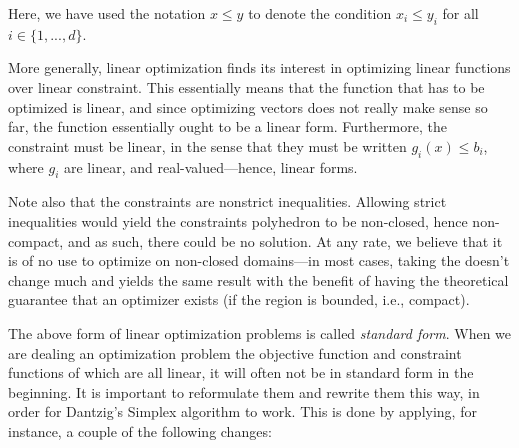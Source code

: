 Here, we have used the notation $ x \leqslant y $ to denote the condition $ x_i \leqslant y_i $ for all $ i \in \{ 1, ..., d \} $.

More generally, linear optimization finds its interest in optimizing linear functions over linear constraint. This essentially means that the function that has to be optimized is linear, and since optimizing vectors does not really make sense so far, the function essentially ought to be a linear form. Furthermore, the constraint must be linear, in the sense that they must be written $ g_i(x) \leqslant b_i $, where $ g_i $ are linear, and real-valued---hence, linear forms.

Note also that the constraints are nonstrict inequalities. Allowing strict inequalities would yield the constraints polyhedron to be non-closed, hence non-compact, and as such, there could be no solution. At any rate, we believe that it is of no use to optimize on non-closed domains---in most cases, taking the doesn't change much and yields the same result with the benefit of having the theoretical guarantee that an optimizer exists (if the region is bounded, i.e., compact).

The above form of linear optimization problems is called \textit{standard form}. When we are dealing an optimization problem the objective function and constraint functions of which are all linear, it will often not be in standard form in the beginning. It is important to reformulate them and rewrite them this way, in order for Dantzig's Simplex algorithm to work. This is done by applying, for instance, a couple of the following changes:

